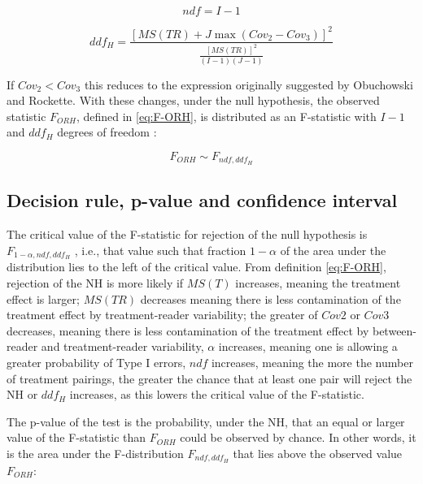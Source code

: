 \documentclass[
]{book}
\begin{document}
\begin{equation}
ndf=I-1
\label{eq:ndf}
\end{equation}

\begin{equation}
ddf_H=\frac{\left [ MS(TR) + J \max(Cov_2-Cov_3)\right ]^2}{\frac{\left [ MS(TR) \right ]^2}{(I-1)(J-1)}}
\label{eq:ddfH}
\end{equation}

If \(Cov_2<Cov_3\) this reduces to the expression originally suggested by Obuchowski and Rockette. With these changes, under the null hypothesis, the observed statistic \(F_{ORH}\), defined in \eqref{eq:F-ORH}, is distributed as an F-statistic with \(I-1\) and \(ddf_H\) degrees of freedom \citep{RN1772, RN1865, RN1866}:

\begin{equation}
F_{ORH}\sim F_{ndf,ddf_H}
\label{eq:SamplingDistrF-ORH}
\end{equation}

\hypertarget{decision-rule-p-value-and-confidence-interval}{%
\subsection{Decision rule, p-value and confidence interval}\label{decision-rule-p-value-and-confidence-interval}}

The critical value of the F-statistic for rejection of the null hypothesis is \(F_{1-\alpha,ndf,ddf_H}\) , i.e., that value such that fraction \(1-\alpha\) of the area under the distribution lies to the left of the critical value. From definition \eqref{eq:F-ORH}, rejection of the NH is more likely if \(MS(T)\) increases, meaning the treatment effect is larger; \(MS(TR)\) decreases meaning there is less contamination of the treatment effect by treatment-reader variability; the greater of \(Cov2\) or \(Cov3\) decreases, meaning there is less contamination of the treatment effect by between-reader and treatment-reader variability, \(\alpha\) increases, meaning one is allowing a greater probability of Type I errors, \(ndf\) increases, meaning the more the number of treatment pairings, the greater the chance that at least one pair will reject the NH or \(ddf_H\) increases, as this lowers the critical value of the F-statistic.

The p-value of the test is the probability, under the NH, that an equal or larger value of the F-statistic than \(F_{ORH}\) could be observed by chance. In other words, it is the area under the F-distribution \(F_{ndf,ddf_H}\) that lies above the observed value \(F_{ORH}\):
\end{document}
